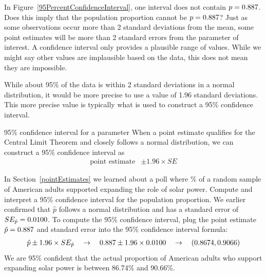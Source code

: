 \begin{examplewrap}
\begin{nexample}{In Figure~\ref{95PercentConfidenceInterval},
one interval does not contain $p = 0.887{}$.
Does this imply that the population proportion cannot be
$p = 0.887{}$?}
Just as some observations occur more than 2 standard deviations
from the mean, some point estimates will be more than
2 standard errors from the parameter of interest.
A confidence interval only provides a plausible range
of values. While we might say other values are implausible
based on the data, this does not mean they are impossible.
\end{nexample}
\end{examplewrap}

While about 95\% of the data is within 2 standard deviations
in a normal distribution, it would be more precise to use
a value of 1.96 standard deviations. This more precise value
is typically what is used to construct a
95\% confidence interval.

\begin{onebox}{95\% confidence interval for a parameter}
  When a point estimate qualifies for the Central Limit
  Theorem and closely follows a normal distribution,
  we can construct a 95\% confidence interval as
  \begin{align*}
  \text{point estimate} &\pm 1.96 \times SE
  \end{align*}
\end{onebox}

\begin{examplewrap}
\begin{nexample}{In Section~\ref{pointEstimates} we learned about
    a poll where \pewsolarpollpercent{}\% of a random sample of
    \pewsolarpollsize{} American adults
    supported expanding the role of solar power. Compute and
    interpret a 95\% confidence interval for the population
    proportion.} \label{95p_ci_for_pew_solar_support}
  We earlier confirmed that $\hat{p}$ follows a normal
  distribution and has a standard error of
  $SE_{\hat{p}} = 0.0100{}$.
  To compute the 95\% confidence interval, plug the
  point estimate $\hat{p} = 0.887{}$ and
  standard error into the 95\% confidence interval formula:
  \begin{align*}
  \hat{p} \pm 1.96 \times SE_{\hat{p}}
  \quad\to\quad
  0.887{} \pm 1.96 \times 0.0100{}
  \quad\to\quad
  (0.8674, 0.9066)
  \end{align*}
  We are 95\% confident that the actual proportion of
  American adults who support expanding solar power is
  between 86.74\% and 90.66\%.
\end{nexample}
\end{examplewrap}


